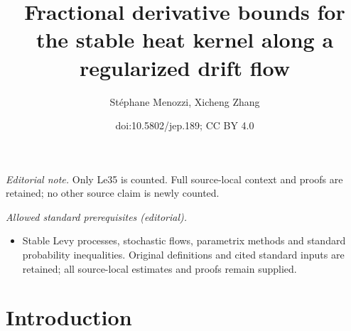 \documentclass[11pt]{article}
\title{Fractional derivative bounds for the stable heat kernel along a regularized drift flow}
\author{Stéphane Menozzi, Xicheng Zhang}
\date{doi:10.5802/jep.189; CC BY 4.0}
\numberwithin{equation}{section}\providecommand{\asymp}{\mathrel{\sim}}
\theoremstyle{plain}
\theoremstyle{definition}
\newcommand\1{{\mathbf{1}}}
\begin{document}
\maketitle
\noindent\textit{Editorial note.} Only Le35 is counted. Full source-local context and proofs are retained; no other source claim is newly counted.\par\medskip
\noindent\textit{Allowed standard prerequisites (editorial).}\begin{itemize}
\item Stable Levy processes, stochastic flows, parametrix methods and standard probability inequalities. Original definitions and cited standard inputs are retained; all source-local estimates and proofs remain supplied.
\end{itemize}\medskip
\section{Introduction}
\end{document}
